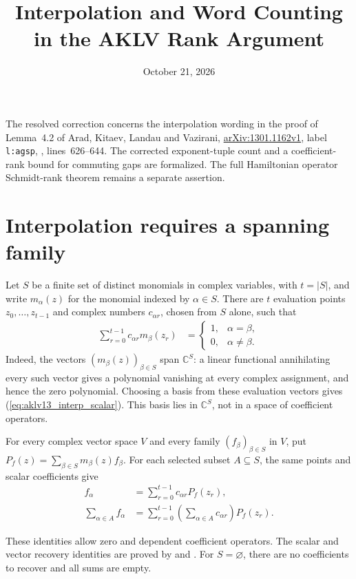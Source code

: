 \documentclass{article}
\title{Interpolation and Word Counting in the AKLV Rank Argument}
\author{}
\date{October 21, 2026}
\begin{document}
\maketitle
{}

The resolved correction concerns the interpolation wording in the proof of
Lemma~4.2 of Arad, Kitaev, Landau and Vazirani,
\href{https://arxiv.org/abs/1301.1162v1}{arXiv:1301.1162v1},
label \texttt{l:agsp},
, lines~626--644.
The corrected exponent-tuple count and a coefficient-rank bound for commuting
gaps are formalized. The full Hamiltonian operator Schmidt-rank theorem remains
a separate assertion.

\section{Interpolation requires a spanning family}

Let $S$ be a finite set of distinct monomials in complex variables, with
$t=|S|$, and write $m_\alpha(z)$ for the monomial indexed by $\alpha\in S$.
There are $t$ evaluation points $z_0,\ldots,z_{t-1}$ and complex numbers
$c_{\alpha r}$, chosen from $S$ alone, such that
\begin{align}
    \sum_{r=0}^{t-1} c_{\alpha r}m_\beta(z_r)
        &= \begin{cases}1,&\alpha=\beta,\\0,&\alpha\ne\beta.\end{cases}
    \label{eq:aklv13_interp_scalar}
\end{align}
Indeed, the vectors $(m_\beta(z))_{\beta\in S}$ span $\mathbb C^S$:
a linear functional annihilating every such vector gives a polynomial
vanishing at every complex assignment, and hence the zero polynomial.
Choosing a basis from these evaluation vectors gives
(\ref{eq:aklv13_interp_scalar}).
This basis lies in $\mathbb C^S$, not in a space of coefficient operators.

For every complex vector space $V$ and every family $(f_\beta)_{\beta\in S}$
in $V$, put $P_f(z)=\sum_{\beta\in S}m_\beta(z)f_\beta$.
For each selected subset $A\subseteq S$, the same points and scalar coefficients give
\begin{align}
    f_\alpha
        &=\sum_{r=0}^{t-1}c_{\alpha r}P_f(z_r),
    \label{eq:aklv13_interp_vector}\\
    \sum_{\alpha\in A}f_\alpha
        &=\sum_{r=0}^{t-1}\left(\sum_{\alpha\in A}c_{\alpha r}\right)P_f(z_r).
    \label{eq:aklv13_interp_sum}
\end{align}
\begin{samepage}
These identities allow zero and dependent coefficient operators. The scalar
and vector recovery identities are proved by
 and
.
For $S=\varnothing$, there are no coefficients to recover and all sums are empty.
\par
\end{samepage}
\end{document}
